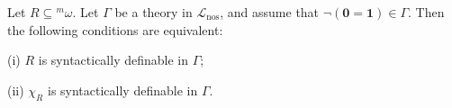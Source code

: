 Let $R \subseteq {}^m\omega$. Let $\Gamma$ be a theory in $\mathcal{L}_{\text{nos}}$, and assume that $\neg(\mathbf{0} = \mathbf{1}) \in \Gamma$. Then the following conditions are equivalent:

(i) $R$ is syntactically definable in $\Gamma$;

(ii) $\chi_R$ is syntactically definable in $\Gamma$.
